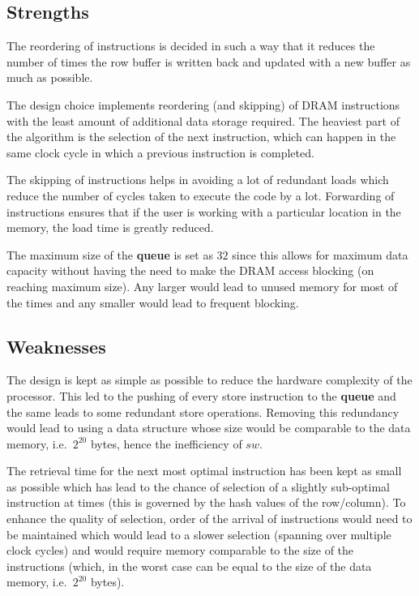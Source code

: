 \documentclass{article}
\begin{document}

\subsection{Strengths}
The reordering of instructions is decided in such a way that it reduces the number of times the row buffer is written back and updated with a new buffer as much as possible.\par
The design choice implements reordering (and skipping) of DRAM instructions with the least amount of additional data storage required. The heaviest part of the algorithm is the selection of the next instruction, which can happen in the same clock cycle in which a previous instruction is completed.\par
The skipping of instructions helps in avoiding a lot of redundant loads which reduce the number of cycles taken to execute the code by a lot. Forwarding of instructions ensures that if the user is working with a particular location in the memory, the load time is greatly reduced.\par
The maximum size of the \textbf{queue} is set as $32$ since this allows for maximum data capacity without having the need to make the DRAM access blocking (on reaching maximum size). Any larger would lead to unused memory for most of the times and any smaller would lead to frequent blocking.

\subsection{Weaknesses}
The design is kept as simple as possible to reduce the hardware complexity of the processor. This led to the pushing of every store instruction to the \textbf{queue} and the same leads to some redundant store operations. Removing this redundancy would lead to using a data structure whose size would be comparable to the data memory, i.e.\ $2^{20}$ bytes, hence the inefficiency of $sw$.\par
The retrieval time for the next most optimal instruction has been kept as small as possible which has lead to the chance of selection of a slightly sub-optimal instruction at times (this is governed by the hash values of the row/column). To enhance the quality of selection, order of the arrival of instructions would need to be maintained which would lead to a slower selection (spanning over multiple clock cycles) and would require memory comparable to the size of the instructions (which, in the worst case can be equal to the size of the data memory, i.e.\ $2^{20}$ bytes).
\end{document}
